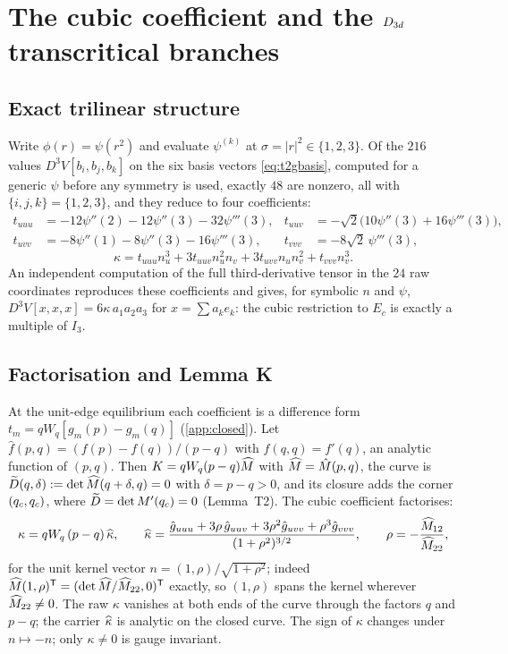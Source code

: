 \section{The cubic coefficient and the $D_{3d}$ transcritical branches}\label{sec:d3d}

\subsection{Exact trilinear structure}

Write $\phi(r)=\psi(r^2)$ and evaluate $\psi^{(k)}$ at $\sigma=|r|^2\in\{1,2,3\}$. Of the $216$ values
$D^3V[b_i,b_j,b_k]$ on the six basis vectors \eqref{eq:t2gbasis}, computed for a generic $\psi$ before any symmetry is
used, exactly $48$ are nonzero, all with $\{i,j,k\}=\{1,2,3\}$, and they reduce to four coefficients:
\begin{equation}\label{eq:tcoeffs}
\begin{aligned}
t_{uuu}&=-12\psi''(2)-12\psi''(3)-32\psi'''(3), & t_{uuv}&=-\sqrt2\bigl(10\psi''(3)+16\psi'''(3)\bigr),\\
t_{uvv}&=-8\psi''(1)-8\psi''(3)-16\psi'''(3), & t_{vvv}&=-8\sqrt2\,\psi'''(3),
\end{aligned}
\end{equation}
\begin{equation}\label{eq:kappa}
\kappa=t_{uuu}n_u^3+3t_{uuv}n_u^2n_v+3t_{uvv}n_un_v^2+t_{vvv}n_v^3 .
\end{equation}
An independent computation of the full third-derivative tensor in the $24$ raw coordinates reproduces these
coefficients and gives, for symbolic $n$ and $\psi$, $D^3V[x,x,x]=6\kappa\,a_1a_2a_3$ for $x=\sum a_ke_k$: the cubic
restriction to $E_c$ is exactly a multiple of $I_3$.

\subsection{Factorisation and Lemma K}

At the unit-edge equilibrium each coefficient is a difference form $t_m=qW_q[g_m(p)-g_m(q)]$ (\cref{app:closed}). Let
$\hat f(p,q)=(f(p)-f(q))/(p-q)$ with $\hat f(q,q)=f'(q)$, an analytic function of $(p,q)$. Then
$K=qW_q(p-q)\widehat{M}$ with $\widehat{M}=\hat M(p,q)$, the curve is $\widetilde{D}(q,\delta):=\det\widehat{M}(q+\delta,q)=0$ with $\delta=p-q>0$,
and its closure adds the corner $(q_{c},q_{c})$, where $\widetilde{D}=\det M'(q_{c})=0$ (Lemma~T2). The cubic coefficient factorises:
\begin{equation}\label{eq:kappafact}
\kappa=qW_q\,(p-q)\,\widehat{\kappa},\qquad \widehat{\kappa}=\frac{\hat g_{uuu}+3\rho\,\hat g_{uuv}+3\rho^2\hat g_{uvv}+\rho^3\hat g_{vvv}}{(1+\rho^2)^{3/2}},\qquad
\rho=-\frac{\widehat{M}_{12}}{\widehat{M}_{22}},
\end{equation}
for the unit kernel vector $n=(1,\rho)/\sqrt{1+\rho^2}$; indeed $\widehat{M}(1,\rho)^{\mathsf T}=(\det\widehat{M}/\widehat{M}_{22},0)^{\mathsf T}$
exactly, so $(1,\rho)$ spans the kernel wherever $\widehat{M}_{22}\ne0$. The raw $\kappa$ vanishes at both ends of the curve
through the factors $q$ and $p-q$; the carrier $\widehat{\kappa}$ is analytic on the closed curve. The sign of $\kappa$ changes
under $n\mapsto-n$; only $\kappa\ne0$ is gauge invariant.


